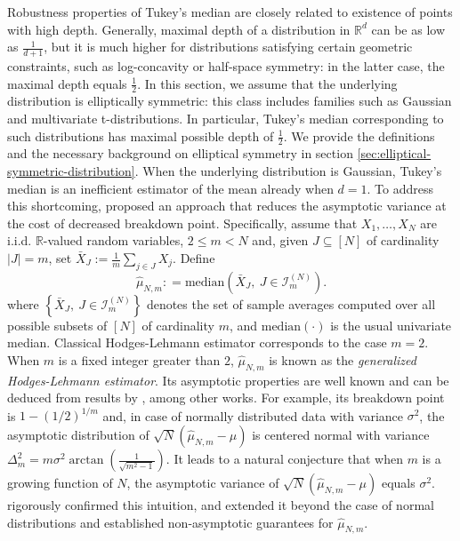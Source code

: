 \documentclass[12pt]{article}
\newcommand{\wh}{\widehat}
\newcommand{\be}[1]{\begin{equation*}#1\end{equation*}}
\def\l{\left}
\def\r{\right}
\newcommand{\m}{\mathcal}
\newcommand{\mb}{\mathbb}
\theoremstyle{thmstyletwo}%
\theoremstyle{thmstylethree}%
\begin{document}
Robustness properties of Tukey's median are closely related to existence of points with high depth. Generally, maximal depth of a distribution in $\mb R^d$ can be as low as $\frac{1}{d+1}$, but it is much higher for distributions satisfying certain geometric constraints, such as log-concavity or half-space symmetry: in the latter case, the maximal depth equals $\frac{1}{2}$. 
In this section, we assume that the underlying distribution is elliptically symmetric: this class includes families such as Gaussian and multivariate t-distributions. In particular, Tukey's median corresponding to such distributions has maximal possible depth of $\frac{1}{2}$. We provide the definitions and the necessary background on elliptical symmetry in section \ref{sec:elliptical-symmetric-distribution}. 
When the underlying distribution is Gaussian, Tukey's median is an inefficient estimator of the mean already when $d=1$. To address this shortcoming, \cite{hodges1963estimates} proposed an approach that reduces the asymptotic variance at the cost of decreased breakdown point.  
Specifically, assume that $X_1,\ldots,X_N$ are i.i.d. $\mb R$-valued random variables, $2\leq m < N$ and, given $J\subseteq [N]$ of cardinality $|J|=m$, set $\bar X_J:= \frac{1}{m}\sum_{j\in J}X_j$. Define 
\be{
\wh\mu_{N,m} : =\mathrm{median}\l(\bar X_J, \ J\in \m I_{m}^{(N)}\r).
}
where $\l\{\bar X_J, \ J\in \m I_{m}^{(N)}\r\}$ denotes the set of sample averages computed over all possible subsets of $[N]$ of cardinality $m$, and $\mathrm{median}(\cdot)$ is the usual univariate median. 
Classical Hodges-Lehmann estimator corresponds to the case $m=2$. When $m$ is a fixed integer greater than $2$, $\wh\mu_{N,m}$ is known as the \emph{generalized Hodges-Lehmann estimator}. Its asymptotic properties are well known and can be deduced from results by \citet{serfling1984generalized}, among other works. For example, its breakdown point is $1-(1/2)^{1/m}$ and, in case of normally distributed data with variance $\sigma^2$, the asymptotic distribution of $\sqrt{N}(\wh\mu_{N,m}-\mu)$ is centered normal with variance $\Delta_m^2 = m\sigma^2\arctan\l( \frac{1}{\sqrt{m^2-1}}\r)$. It leads to a natural conjecture that when $m$ is a growing function of $N$, the asymptotic variance of $\sqrt{N}(\wh\mu_{N,m}-\mu)$ equals $\sigma^2$. \cite{diciccio2022clt} rigorously confirmed this intuition, and \cite{minsker2023u} extended it beyond the case of normal distributions and established non-asymptotic guarantees for $\wh \mu_{N,m}$. 
\end{document}
